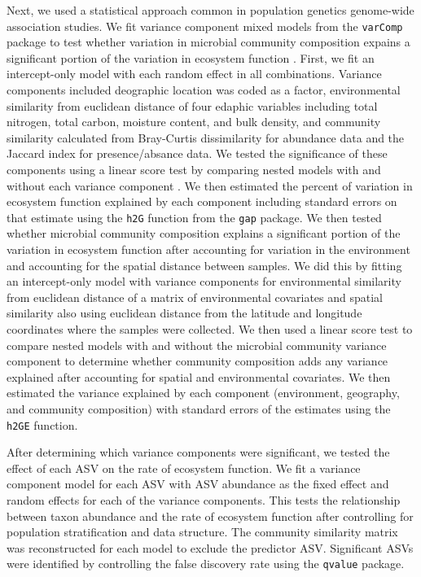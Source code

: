 \documentclass{article}
\begin{document}
Next, we used a statistical approach common in population genetics genome-wide
association studies. We fit variance component mixed models from the
\texttt{varComp} package to test whether variation in microbial
community composition expains a significant portion of the variation in
ecosystem function \citep{qu2013}. First, we fit an intercept-only model with
each random effect in all combinations. Variance components included deographic location was coded as a factor, environmental
similarity from euclidean distance of four edaphic variables including total
nitrogen, total carbon, moisture content, and bulk density, and
community similarity calculated from Bray-Curtis dissimilarity for abundance
data and the Jaccard index for presence/absance data. We tested the significance
of these components using a linear score test by comparing nested models with and
without each variance component \citep{qu2013}. We then estimated
the percent of variation in ecosystem function explained by each component 
including standard errors on that estimate 
using the \texttt{h2G} function from the
\texttt{gap} package. We then tested whether microbial community composition explains a
significant portion of the variation in ecosystem function after accounting for
variation in the environment and accounting for the spatial distance between
samples. We did this by fitting an intercept-only model with variance components
for environmental similarity from euclidean distance of a matrix of
environmental covariates and spatial similarity
also using euclidean distance from the latitude and longitude coordinates where
the samples were collected. We then used a linear score test to compare
nested models with and without the microbial community variance component to
determine whether community composition adds any variance explained after
accounting for spatial and environmental covariates. We then estimated the
variance explained by each component (environment, geography, and community
composition) with standard errors of the estimates using the \texttt{h2GE}
function. 

After determining which variance components were significant, we tested the
effect of each ASV on the rate of ecosystem function. We fit a variance
component model for each ASV with ASV abundance as the fixed effect and random
effects for each of the variance components. This tests the relationship between
taxon abundance and the rate of ecosystem function after controlling for
population stratification and data structure. The community similarity matrix
was reconstructed for each model to exclude the predictor ASV. 
Significant ASVs were identified by controlling the false discovery rate using
the \texttt{qvalue} package.
\end{document}
